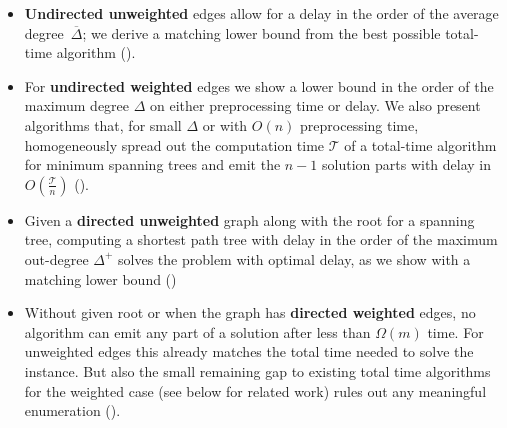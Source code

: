 \documentclass[a4paper, USenglish, cleveref, autoref, thm-restate]{lipics-v2021}
\newcommand{\maxdeg}{\Delta}
\newcommand{\maxoutdeg}{\Delta^+}
\newcommand{\avgdeg}{\overline{\Delta}}
\newcommand{\totaltime}{\mathcal{T}}
\begin{document}
\begin{itemize}
	\item \textbf{Undirected unweighted} edges allow for a delay in the order of the average degree~$\avgdeg$; we derive a matching lower bound from the best possible total-time algorithm ().
	\item For \textbf{undirected weighted} edges we show a lower bound in the order of the maximum degree $\maxdeg$ on either preprocessing time or delay.
	We also present algorithms that, for small $\maxdeg$ or with $O(n)$ preprocessing time, homogeneously spread out the computation time $\totaltime$ of a total-time algorithm for minimum spanning trees and emit the $n-1$ solution parts with delay in $O(\frac{\totaltime}{n})$ ().
	\item Given a \textbf{directed unweighted} graph along with the root for a spanning tree, computing a shortest path tree with delay in the order of the maximum out-degree $\maxoutdeg$ \cite{caselShortestDistancesEnumeration2024} solves the problem with optimal delay, as we show with a matching lower bound ()
	\item Without given root or when the graph has \textbf{directed weighted} edges, no algorithm can emit any part of a solution after less than $\Omega(m)$ time.
	For unweighted edges this already matches the total time needed to solve the instance.
	But also the small remaining gap to existing total time algorithms for the weighted case (see below for related work) rules out any meaningful enumeration ().
\end{itemize}
\end{document}
